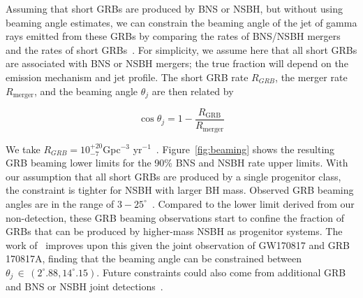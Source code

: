 Assuming that short \acp{GRB} are produced by \ac{BNS} or \ac{NSBH}, but
without using beaming angle estimates, we can constrain the beaming angle of the jet
of gamma rays emitted from these \acp{GRB} by comparing the rates of
\ac{BNS}/\ac{NSBH} mergers and the rates of
short \acp{GRB}~\citep{Chen:2012qh}.
For simplicity, we assume here that all short \acp{GRB} are associated with \ac{BNS}
or \ac{NSBH} mergers; the true fraction will
depend on the emission mechanism and jet profile.  The short \ac{GRB} rate $R_{GRB}$, the merger rate
$R_{\mathrm{merger}}$, and the beaming angle $\theta_j$ are then related by
%
\begin{linenomath*}
\begin{equation}\label{eq:beaming}
\cos \theta_j = 1 - \frac{R_{\mathrm{GRB}}}{R_{\mathrm{merger}}}
\end{equation}
\end{linenomath*}

%
We take $R_{GRB}=10^{+20}_{-7}$Gpc$^{-3}$
yr$^{-1}$~\citep{Coward:2012gn,Nakar:2005bs}.
Figure~\ref{fig:beaming} shows the resulting \ac{GRB} beaming lower limits for the
90\% \ac{BNS} and \ac{NSBH} rate upper limits.
With our assumption that all short \ac{GRB}s are produced by a single progenitor
class, the constraint is tighter for \ac{NSBH} with larger
\ac{BH} mass.
Observed \ac{GRB} beaming angles are in the range of
$3-25^{\circ}$~\citep{Fox:2005kv,Fong:2015oha,Grupe:2006uc,Soderberg:2006bn,2013ApJ...766...41S,2012ApJ...756...63M,2011A&A...531L...6N}.
Compared to the lower limit derived from our non-detection, these \ac{GRB}
beaming observations start to confine the fraction of \ac{GRB}s that can be
produced by higher-mass NSBH as progenitor systems. The work of~\cite{Williams_2018}
improves upon this given the joint observation of GW170817 and GRB 170817A, finding
that the beaming angle can be constrained between $\theta_j \, \in \, (2^{\circ}.88, 14^{\circ}.15)$.
Future constraints could also come from additional \ac{GRB} and \ac{BNS} or \ac{NSBH} joint
detections~\citep{Dietz:2010eh,Regimbau:2014nxa, Clark:2014jpa, Williams_2018, Hayes:2019hso}.

\newpage

